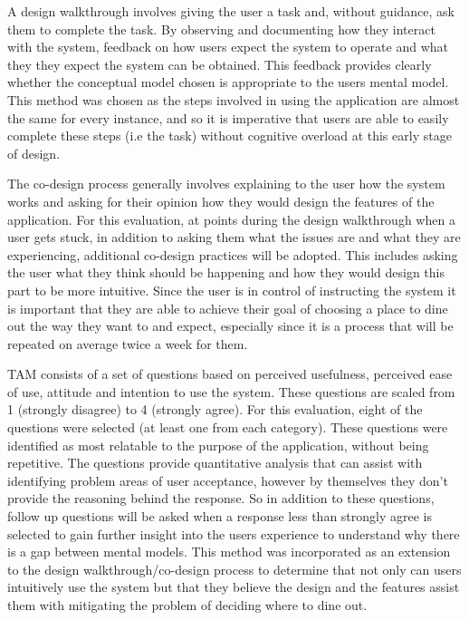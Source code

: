 \documentclass[a4 paper, 12pt]{article}
\begin{document}
A design walkthrough involves giving the user a task and, without guidance, ask them to complete the task. By observing and documenting how they interact with the system, feedback on how users expect the system to operate and what they they expect the system can be obtained. This feedback provides clearly whether the conceptual model chosen is appropriate to the users mental model. This method was chosen as the steps involved in using the application are almost the same for every instance, and so it is imperative that users are able to easily complete these steps (i.e the task) without cognitive overload at this early stage of design.

The co-design process generally involves explaining to the user how the system works and asking for their opinion how they would design the features of the application. For this evaluation, at points during the design walkthrough when a user gets stuck, in addition to asking them what the issues are and what they are experiencing, additional co-design practices will be adopted. This includes asking the user what they think should be happening and how they would design this part to be more intuitive. Since the user is in control of instructing the system it is important that they are able to achieve their goal of choosing a place to dine out the way they want to and expect, especially since it is a process that will be repeated on average twice a week for them. 

TAM consists of a set of questions based on perceived usefulness, perceived ease of use, attitude and intention to use the system. These questions are scaled from 1 (strongly disagree) to 4 (strongly agree). For this evaluation, eight of the questions were selected (at least one from each category). These questions were identified as most relatable to the purpose of the application, without being repetitive. The questions provide quantitative analysis that can assist with identifying problem areas of user acceptance, however by themselves they don't provide the reasoning behind the response. So in addition to these questions, follow up questions will be asked when a response less than strongly agree is selected to gain further insight into the users experience to understand why there is a gap between mental models. This method was incorporated as an extension to the design walkthrough/co-design process to determine that not only can users intuitively use the system but that they believe the design and the features assist them with mitigating the problem of deciding where to dine out.
\end{document}
